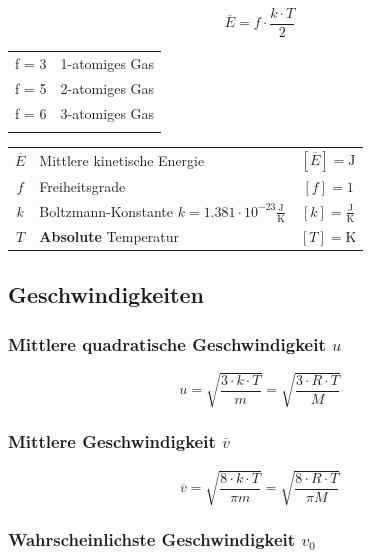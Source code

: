 \begin{minipage}{0.48\linewidth}
$$ \boxed{ \overline{E} = f \cdot \frac{k \cdot T}{2} } $$
\end{minipage}
\hfill
\begin{minipage}{0.48\linewidth}
\begin{tabular}{ll}
f = 3 & 1-atomiges Gas \\
f = 5 & 2-atomiges Gas \\
f = 6 & 3-atomiges Gas \\
\\
\end{tabular}
\end{minipage}


\begin{tabular}{c l c}
	$\overline{E}$ & Mittlere kinetische Energie & $[\overline{E}] = \mathrm{J}$ \\
	$f$ & Freiheitsgrade & $[f] = \text{1}$ \\
	\rule{0pt}{8pt}$k$ & Boltzmann-Konstante $k = 1.381 \cdot 10^{-23} \mathrm{\frac{J}{K}}$ & $[k] = \mathrm{\frac{J}{K}}$ \\
	$T$ & \textbf{Absolute} Temperatur & $[T] = \mathrm{K}$ \\	
\end{tabular}


\subsection{Geschwindigkeiten}

\subsubsection{Mittlere quadratische Geschwindigkeit  $u$}

$$ \boxed{ u = \sqrt{\frac{3 \cdot k \cdot T}{m}} = \sqrt{\frac{3 \cdot R \cdot T}{M}} }  $$


\subsubsection{Mittlere Geschwindigkeit $\overline{v}$}

$$ \boxed{ \overline{v} = \sqrt{\frac{8 \cdot k \cdot T}{\pi m}} = \sqrt{\frac{8 \cdot R \cdot T}{\pi M}} }  $$


\subsubsection{Wahrscheinlichste Geschwindigkeit $v_0$}

